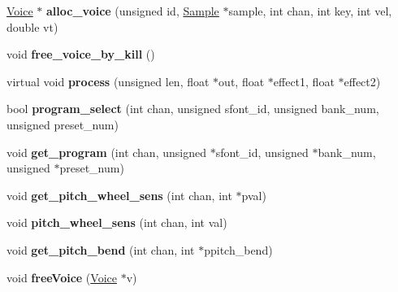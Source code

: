 \begin{DoxyCompactItemize}
\hyperlink{class_fluid_s_1_1_voice}{Voice} $\ast$ {\bfseries alloc\+\_\+voice} (unsigned id, \hyperlink{class_fluid_s_1_1_sample}{Sample} $\ast$sample, int chan, int key, int vel, double vt)
\item 
\mbox{\label{class_fluid_s_1_1_fluid_aa4ae1bac80cfed1357b9041a63a39145}} 
void {\bfseries free\+\_\+voice\+\_\+by\+\_\+kill} ()
\item 
\mbox{\label{class_fluid_s_1_1_fluid_ab0f0b2eadf8487febaeb8b44a8b66559}} 
virtual void {\bfseries process} (unsigned len, float $\ast$out, float $\ast$effect1, float $\ast$effect2)
\item 
\mbox{\label{class_fluid_s_1_1_fluid_a08ef04452f9548aed549638833139daf}} 
bool {\bfseries program\+\_\+select} (int chan, unsigned sfont\+\_\+id, unsigned bank\+\_\+num, unsigned preset\+\_\+num)
\item 
\mbox{\label{class_fluid_s_1_1_fluid_a11f451b412679f0821f5775bd07f0096}} 
void {\bfseries get\+\_\+program} (int chan, unsigned $\ast$sfont\+\_\+id, unsigned $\ast$bank\+\_\+num, unsigned $\ast$preset\+\_\+num)
\item 
\mbox{\label{class_fluid_s_1_1_fluid_a13d62eb8e6ecd24a302d330d5b820660}} 
void {\bfseries get\+\_\+pitch\+\_\+wheel\+\_\+sens} (int chan, int $\ast$pval)
\item 
\mbox{\label{class_fluid_s_1_1_fluid_abd088a4683eaa8a1fd28453eab076fae}} 
void {\bfseries pitch\+\_\+wheel\+\_\+sens} (int chan, int val)
\item 
\mbox{\label{class_fluid_s_1_1_fluid_ab2241c859e9ee88676471a0f9bd6eba0}} 
void {\bfseries get\+\_\+pitch\+\_\+bend} (int chan, int $\ast$ppitch\+\_\+bend)
\item 
\mbox{\label{class_fluid_s_1_1_fluid_a03a99db27e2acd25c038241efb4951fb}} 
void {\bfseries free\+Voice} (\hyperlink{class_fluid_s_1_1_voice}{Voice} $\ast$v)
\item 
\mbox{\label{class_fluid_s_1_1_fluid_a198db5e3fa698a46dcc54f0c12835c95}} 

\end{DoxyCompactItemize}
